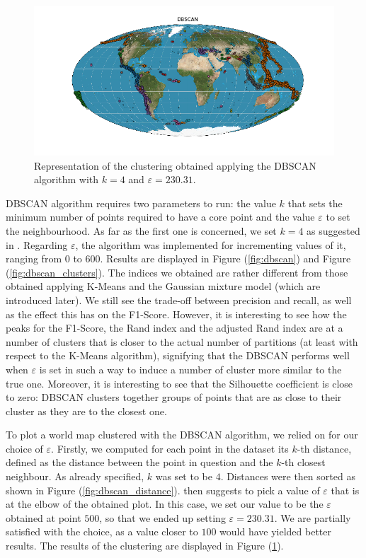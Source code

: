 \documentclass[a4paper]{article}
\begin{document}
	 \begin{figure}
		\includegraphics[width=\linewidth]{DBSCAN.png}
		\caption{Representation of the clustering obtained applying the DBSCAN algorithm with $k= 4$ and $\varepsilon = 230.31$.}
		\label{fig:dbscan_world}
	\end{figure}
	DBSCAN algorithm requires two parameters to run: the value $k$ that sets the minimum number of points required to have a core point and the value $\varepsilon$ to set the neighbourhood. As far as the first one is concerned, we set $k=4$ as suggested in \cite{Ester96adensity-based}.
	Regarding $\varepsilon$, the algorithm was implemented for incrementing values of it, ranging from $0$ to $600$. Results are displayed in Figure (\ref{fig:dbscan}) and Figure (\ref{fig:dbscan_clusters}).
	The indices we obtained are rather different from those obtained applying K-Means and the Gaussian mixture model (which are introduced later). We still see the trade-off between precision and recall, as well as the effect this has on the F1-Score. However, it is interesting to see how the peaks for the F1-Score, the Rand index and the adjusted Rand index are at a number of clusters that is closer to the actual number of partitions (at least with respect to the K-Means algorithm), signifying that the DBSCAN performs well when $\varepsilon$ is set in such a way to induce a number of cluster more similar to the true one. Moreover, it is interesting to see that the Silhouette coefficient is close to zero: DBSCAN clusters together groups of points that are as close to their cluster as they are to the closest one.
	
	To plot a world map clustered with the DBSCAN algorithm, we relied on \cite{Ester96adensity-based} for our choice of $\varepsilon$.
	Firstly, we computed for each point in the dataset its $k$-th distance, defined as the distance between the point in question and the $k$-th closest neighbour. As already specified, $k$ was set to be $4$. Distances were then sorted as shown in Figure (\ref{fig:dbscan_distance}).
	\cite{Ester96adensity-based} then suggests to pick a value of $\varepsilon$ that is at the elbow of the obtained plot. In this case, we set our value to be the $\varepsilon$ obtained at point $500$, so that we ended up setting $\varepsilon= 230.31$. We are partially satisfied with the choice, as a value closer to $100$ would have yielded better results. The results of the clustering are displayed in Figure (\ref{fig:dbscan_world}).
	
\end{document}
